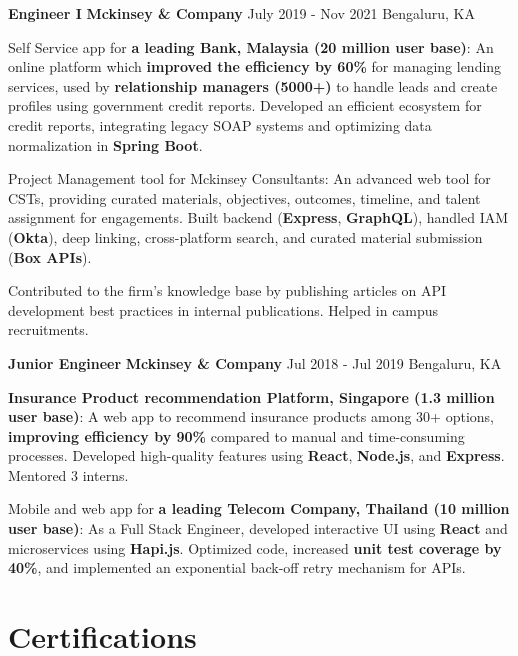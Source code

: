 \documentclass[letterpaper]{resume_config}
\begin{document}
\WorkExperience
    {\textbf{Engineer I}} %
    {\textbf{Mckinsey \& Company}} %
    {July 2019 - Nov 2021} %
    {Bengaluru, KA} %
{
    \item Self Service app for \textbf{a leading Bank, Malaysia (20 million user base)}: An online platform which \textbf{improved the efficiency by 60\%} for managing lending services, used by \textbf{relationship managers (5000+)} to handle leads and create profiles using government credit reports. Developed an efficient ecosystem for credit reports, integrating legacy SOAP systems and optimizing data normalization in \textbf{Spring Boot}.
    \item Project Management tool for Mckinsey Consultants: An advanced web tool for CSTs, providing curated materials, objectives, outcomes, timeline, and talent assignment for engagements. Built backend (\textbf{Express}, \textbf{GraphQL}), handled IAM (\textbf{Okta}), deep linking, cross-platform search, and curated material submission (\textbf{Box APIs}).
    \item Contributed to the firm's knowledge base by publishing articles on API development best practices in internal publications. Helped in campus recruitments.
    }
    
\WorkExperience
    {\textbf{Junior Engineer}} %
    {\textbf{Mckinsey \& Company}} %
    {Jul 2018 - Jul 2019} %
    {Bengaluru, KA} %
    {
            \item \textbf{Insurance Product recommendation Platform, Singapore (1.3 million user base)}: A web app to recommend insurance products among 30+ options, \textbf{improving efficiency by 90\%} compared to manual and time-consuming processes. Developed high-quality features using \textbf{React}, \textbf{Node.js}, and \textbf{Express}. Mentored 3 interns.
            \item Mobile and web app for \textbf{a leading Telecom Company, Thailand (10 million user base)}: As a Full Stack Engineer, developed interactive UI using \textbf{React} and microservices using \textbf{Hapi.js}. Optimized code, increased \textbf{unit test coverage by 40\%}, and implemented an exponential back-off retry mechanism for APIs.
 }
    

\section{\textcolor{NavyBlue}{Certifications}}
\end{document}
